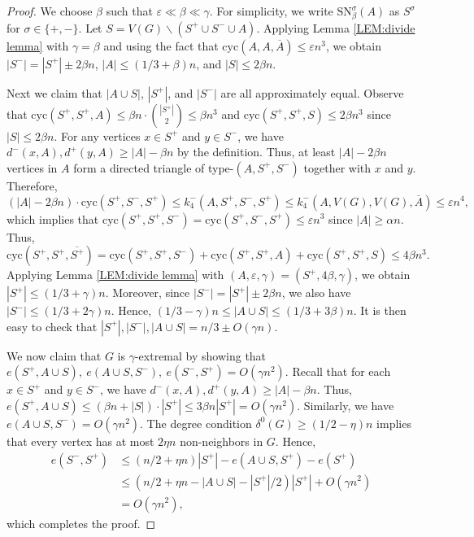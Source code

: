 \documentclass[11pt,a4paper,reqno]{amsart}
\theoremstyle{definition} %
\begin{document}
\begin{proof} 
We choose $\beta$ such that $\varepsilon \ll \beta \ll \gamma$. For simplicity, we write $\text{SN}^\sigma_\beta(A)$ as $S^\sigma$ for  $\sigma\in\{+,-\}$. Let $S=V(G) \backslash(S^+\cup S^-\cup A)$. Applying Lemma \ref{LEM:divide lemma} with $\gamma=\beta$ and using the fact that $\text{cyc}(A,A,\overline{A})\leqslant \varepsilon n^3$, we obtain $|S^-|=|S^+|\pm 2\beta n$, $|A|\leqslant(1/3+\beta)n$, and $|S|\leqslant2\beta n$.

Next we claim that $|A\cup S|$, $|S^+|$, and $|S^-|$ are all approximately equal. Observe that $\text{cyc}(S^+, S^+, A)\leqslant \beta n \cdot \binom{|S^+|}{2} \leqslant \beta n^3$ and $\text{cyc}(S^+, S^+, S)\leqslant 2\beta n^3$ since $|S|\leqslant 2\beta n$. For any vertices $x\in S^+$ and $y\in S^-$, we have $d^-(x,A),d^+(y,A)\geqslant |A|-\beta n$ by the definition. Thus, at least $|A|-2\beta n$ vertices in $A$ form a directed triangle of type-$(A,S^+,S^-)$ together with $x$ and $y$. Therefore,
$$
(|A|-2\beta n)\cdot\text{cyc}(S^+,S^-,S^+)\leqslant k_4^-(A,S^+,S^-,S^+)\leqslant k_4^-(A,V(G),V(G),\overline{A})\leqslant \varepsilon n^4,
$$
which implies that $\text{cyc}(S^+,S^+,S^-)=\text{cyc}(S^+,S^-,S^+)\leqslant\varepsilon n^3$ since $|A|\geqslant \alpha n$. Thus, 
$$
\text{cyc}(S^+, S^+, \overline{S^+})=\text{cyc}(S^+,S^+,S^-)+\text{cyc}(S^+, S^+, A)+\text{cyc}(S^+, S^+, S)\leqslant 4\beta n^3.
$$
Applying Lemma \ref{LEM:divide lemma} with $(A,\varepsilon,\gamma)=(S^+,4\beta,\gamma)$, we obtain $|S^+|\leqslant (1/3+\gamma)n$. Moreover, since $|S^-|=|S^+|\pm 2\beta n$, we also have $|S^-|\leqslant (1/3+2\gamma)n$. Hence, $(1/3-\gamma)n\leqslant |A\cup S|\leqslant (1/3+3\beta)n$. 
It is then easy to check that $|S^+|,|S^-|,|A\cup S|=n/3\pm O(\gamma n)$.

We now claim that $G$ is $\gamma$-extremal by showing that $e(S^+,A\cup S),\ e(A\cup S,S^-),\ e(S^-, S^+) = O(\gamma n^2)$. 
Recall that for each $x\in S^+$ and $y\in S^-$, we have $d^-(x,A),d^+(y,A)\geqslant |A|-\beta n$. Thus, $e(S^+,A\cup S)\leqslant (\beta n+|S|)\cdot |S^+|\leqslant 3\beta n|S^+|=O(\gamma n^2)$. 
Similarly, we have $e(A\cup S,S^-)=O(\gamma n^2)$. The degree condition $\delta^0(G)\geqslant (1/2-\eta)n$ implies that every vertex has at most $2 \eta n$ non-neighbors in $G$. Hence,
\begin{align*}
    e(S^-,S^+)&\leqslant (n/2+\eta n) |S^+|- e(A\cup S,S^+)-e(S^+)\\
    &\leqslant (n/2+\eta n -|A\cup S|-|S^+|/2)|S^+|  + O(\gamma n^2)\\
    &= O(\gamma n^2),
\end{align*}
which completes the proof.
\end{proof}
\end{document}

